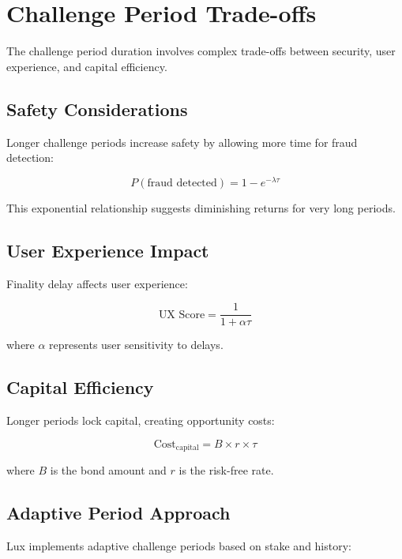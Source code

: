 \section{Challenge Period Trade-offs}


The challenge period duration involves complex trade-offs between security, user experience, and capital efficiency.

\subsection{Safety Considerations}

Longer challenge periods increase safety by allowing more time for fraud detection:

\begin{equation}
P(\text{fraud detected}) = 1 - e^{-\lambda \tau}
\end{equation}

This exponential relationship suggests diminishing returns for very long periods.

\subsection{User Experience Impact}

Finality delay affects user experience:

\begin{equation}
\text{UX Score} = \frac{1}{1 + \alpha \tau}
\end{equation}

where $\alpha$ represents user sensitivity to delays.

\subsection{Capital Efficiency}

Longer periods lock capital, creating opportunity costs:

\begin{equation}
\text{Cost}_{\text{capital}} = B \times r \times \tau
\end{equation}

where $B$ is the bond amount and $r$ is the risk-free rate.

\subsection{Adaptive Period Approach}

Lux implements adaptive challenge periods based on stake and history:

